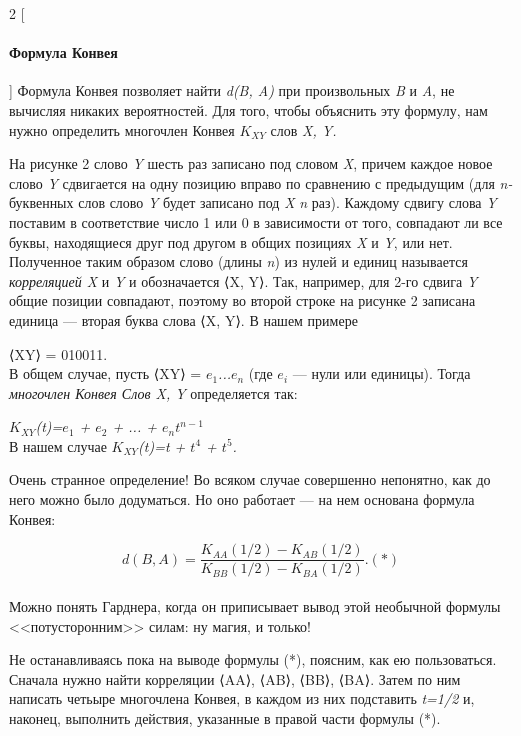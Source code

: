 \begin{multicols}{2}
[\paragraph{Формула Конвея\\}]
Формула Конвея позволяет найти \textit{d(B, A)} при произвольных \textit{B} и \textit{A}, не вычисляя никаких вероятностей. Для того, чтобы объяснить эту формулу, нам нужно определить многочлен Конвея \textit{ $K_{XY}$ } слов \textit{X, Y.}

На рисунке 2 слово \textit{Y} шесть раз записано под словом \textit{X}, причем каждое новое слово \textit{Y} сдвигается на одну позицию вправо по сравнению с предыдущим (для \textit{n-}буквенных слов слово \textit{Y} будет записано под \textit{X} \textit{n} раз). Каждому сдвигу слова \textit{Y} поставим в соответствие число 1 или 0 в зависимости от того, совпадают ли все буквы, находящиеся друг под другом в общих позициях \textit{X} и \textit{Y}, или нет. Полученное таким образом слово (длины \textit{n}) из нулей и единиц называется \textit{корреляцией X} и \textit{Y} и обозначается ⟨X, Y⟩. Так, например, для 2-го сдвига \textit{Y} общие позиции совпадают, поэтому во второй строке на рисунке 2 записана единица --- вторая буква слова ⟨X, Y⟩. В нашем примере

⟨XY⟩ = 010011.\\
В общем случае, пусть ⟨XY⟩ = \textit{$e_{1}$...$e_{n}$} (где \textit{$e_{i}$} --- нули или единицы). Тогда \textit{многочлен Конвея Слов X, Y} определяется так:

\textit{$K_{XY}$(t)=$e_{1}$ + $e_{2}$ + ... + $e_{n}$$t^{n-1}$}\\
В нашем случае \textit{$K_{XY}$(t)=t + $t^{4}$ + $t^{5}$.}

Очень странное определение! Во всяком случае совершенно непонятно, как до него можно было додуматься. Но оно работает --- на нем основана формула Конвея: 

\textit{$$d(B, A)=\frac{K_{AA}(1/2)-K_{AB}(1/2)}{K_{BB}(1/2)-K_{BA}(1/2)}. (*)$$}\\
Можно понять Гарднера, когда он приписывает вывод этой необычной формулы <<потусторонним>> силам: ну магия, и только!

Не останавливаясь пока на выводе формулы (*), поясним, как ею пользоваться. Сначала нужно найти корреляции ⟨AA⟩, ⟨AB⟩, ⟨BB⟩, ⟨BA⟩. Затем по ним написать четьыре многочлена Конвея, в каждом из них подставить \textit{t=1/2} и, наконец, выполнить действия, указанные в правой части формулы (*).

\end{multicols}

